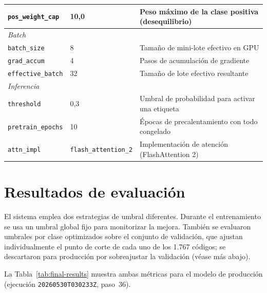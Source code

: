 \begin{table}[h]
\begin{tabular}{lll}
\texttt{pos\_weight\_cap} & 10{,}0      & Peso máximo de la clase positiva (desequilibrio) \\
\hline
\multicolumn{3}{l}{\textit{Batch}} \\
\texttt{batch\_size}     & 8             & Tamaño de mini-lote efectivo en GPU \\
\texttt{grad\_accum}     & 4             & Pasos de acumulación de gradiente \\
\texttt{effective\_batch}& 32            & Tamaño de lote efectivo resultante \\
\hline
\multicolumn{3}{l}{\textit{Inferencia}} \\
\texttt{threshold}       & 0{,}3         & Umbral de probabilidad para activar una etiqueta \\
\texttt{pretrain\_epochs}& 10            & Épocas de precalentamiento con todo congelado \\
\texttt{attn\_impl}     & \texttt{flash\_attention\_2} & Implementación de atención (FlashAttention 2) \\
\hline
\end{tabular}
\end{table}

\section{Resultados de evaluación}

El sistema emplea dos estrategias de umbral diferentes. Durante el entrenamiento se usa un umbral global fijo para monitorizar la mejora. También se evaluaron umbrales por clase optimizados sobre el conjunto de validación, que ajustan individualmente el punto de corte de cada uno de los 1.767 códigos; se descartaron para producción por sobreajustar la validación (véase más abajo).

La Tabla~\ref{tab:final-results} muestra ambas métricas para el modelo de producción (ejecución \texttt{20260530T030233Z}, paso~36).

